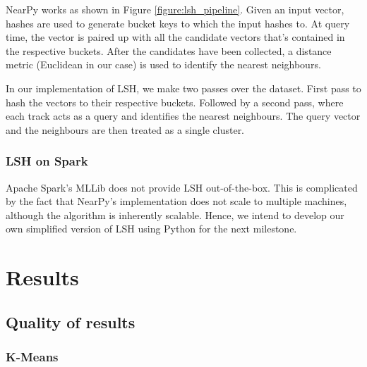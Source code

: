 \documentclass[10pt,a4paper]{scrartcl}
\begin{document}
    NearPy works as shown in Figure \ref{figure:lsh_pipeline}. 
    Given an input vector, hashes are used to generate bucket keys to which the input hashes to.
    At query time, the vector is paired up with all the candidate vectors that's contained in the respective buckets.
    After the candidates have been collected, a distance metric (Euclidean in our case) is used to identify the nearest neighbours.
    
    In our implementation of LSH, we make two passes over the dataset.
    First pass to hash the vectors to their respective buckets.
    Followed by a second pass, where each track acts as a query and identifies the nearest neighbours.
    The query vector and the neighbours are then treated as a single cluster.
      \subsubsection{LSH on Spark}
      Apache Spark's MLLib does not provide LSH out-of-the-box.
      This is complicated by the fact that NearPy's implementation does not scale to multiple machines, although the algorithm is inherently scalable.
      Hence, we intend to develop our own simplified version of LSH using Python for the next milestone.
  \section{Results}
    \subsection{Quality of results}
      \subsubsection{K-Means}
\end{document}
